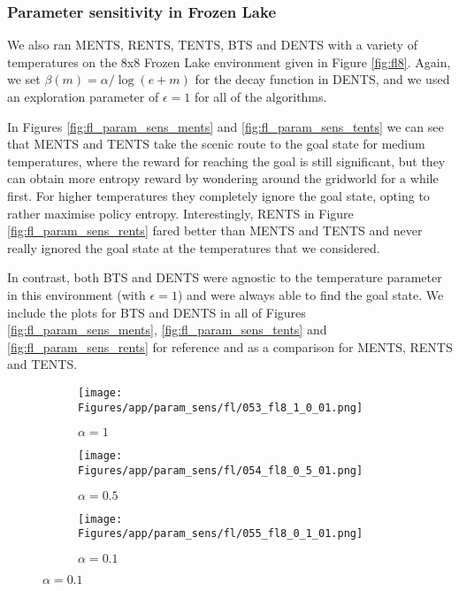 \documentclass{article}
\theoremstyle{plain}
\begin{document}
\begin{appendices}
        \FloatBarrier
        \subsubsection{Parameter sensitivity in Frozen Lake} \label{app:param_sens_fl}
            We also ran MENTS, RENTS, TENTS, BTS and DENTS with a variety of temperatures on the 8x8 Frozen Lake environment given in Figure \ref{fig:fl8}. Again, we set $\beta(m)=\alpha/\log(e+m)$ for the decay function in DENTS, and we used an exploration parameter of $\epsilon=1$ for all of the algorithms. 

            In Figures \ref{fig:fl_param_sens_ments} and \ref{fig:fl_param_sens_tents} we can see that MENTS and TENTS take the scenic route to the goal state for medium temperatures, where the reward for reaching the goal is still significant, but they can obtain more entropy reward by wondering around the gridworld for a while first. For higher temperatures they completely ignore the goal state, opting to rather maximise policy entropy. Interestingly, RENTS in Figure \ref{fig:fl_param_sens_rents} fared better than MENTS and TENTS and never really ignored the goal state at the temperatures that we considered.

            In contrast, both BTS and DENTS were agnostic to the temperature parameter in this environment (with $\epsilon=1$) and were always able to find the goal state. We include the plots for BTS and DENTS in all of Figures \ref{fig:fl_param_sens_ments}, \ref{fig:fl_param_sens_tents} and \ref{fig:fl_param_sens_rents} for reference and as a comparison for MENTS, RENTS and TENTS.
        
            \FloatBarrier
            
            \begin{figure}
                \centering
                
                \begin{subfigure}[b]{0.32\textwidth}
                    \centering
                    \texttt{[image: Figures/app/param\_sens/fl/053\_fl8\_1\_0\_01.png]}
                    \caption{$\alpha=1$}
                \end{subfigure}
                \begin{subfigure}[b]{0.32\textwidth}
                    \centering
                    \texttt{[image: Figures/app/param\_sens/fl/054\_fl8\_0\_5\_01.png]}
                    \caption{$\alpha=0.5$}
                \end{subfigure}
                \begin{subfigure}[b]{0.32\textwidth}
                    \centering
                    \texttt{[image: Figures/app/param\_sens/fl/055\_fl8\_0\_1\_01.png]}
                    \caption{$\alpha=0.1$}
                \end{subfigure}
                

\end{figure}
\end{appendices}
\end{document}
